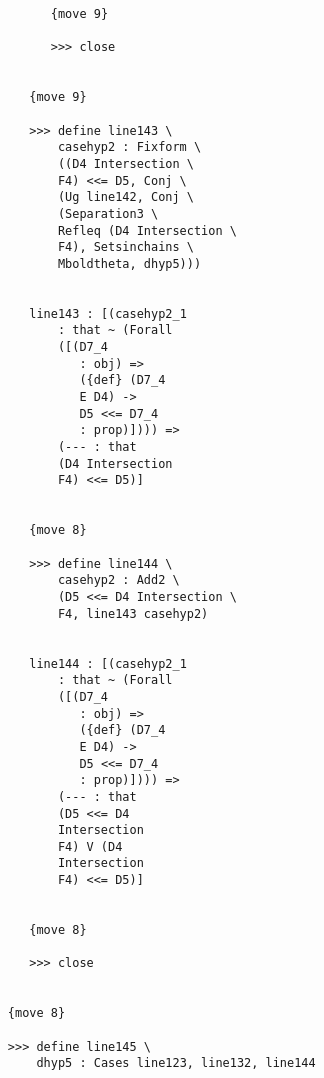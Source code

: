 \documentclass[12pt]{article}
\begin{document}
\begin{verbatim}
                              {move 9}

                              >>> close


                           {move 9}

                           >>> define line143 \
                               casehyp2 : Fixform \
                               ((D4 Intersection \
                               F4) <<= D5, Conj \
                               (Ug line142, Conj \
                               (Separation3 \
                               Refleq (D4 Intersection \
                               F4), Setsinchains \
                               Mboldtheta, dhyp5)))


                           line143 : [(casehyp2_1 
                               : that ~ (Forall 
                               ([(D7_4 
                                  : obj) => 
                                  ({def} (D7_4 
                                  E D4) -> 
                                  D5 <<= D7_4 
                                  : prop)]))) => 
                               (--- : that 
                               (D4 Intersection 
                               F4) <<= D5)]


                           {move 8}

                           >>> define line144 \
                               casehyp2 : Add2 \
                               (D5 <<= D4 Intersection \
                               F4, line143 casehyp2)


                           line144 : [(casehyp2_1 
                               : that ~ (Forall 
                               ([(D7_4 
                                  : obj) => 
                                  ({def} (D7_4 
                                  E D4) -> 
                                  D5 <<= D7_4 
                                  : prop)]))) => 
                               (--- : that 
                               (D5 <<= D4 
                               Intersection 
                               F4) V (D4 
                               Intersection 
                               F4) <<= D5)]


                           {move 8}

                           >>> close


                        {move 8}

                        >>> define line145 \
                            dhyp5 : Cases line123, line132, line144



\end{verbatim}
\end{document}
